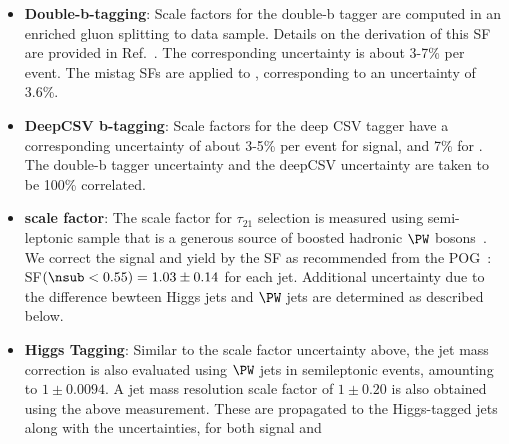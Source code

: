 \begin{itemize}
\item \textbf{Double-b-tagging}: Scale factors for the double-b tagger are computed in an enriched gluon splitting to \bbbar data sample. Details on the derivation of this SF are provided in Ref.~\cite{DoubleBSFTWiki}. The corresponding uncertainty is about 3-7\% per event. The mistag SFs are applied to \ttbar, corresponding to an uncertainty of 3.6\%.

\item \textbf{DeepCSV b-tagging}: Scale factors for the deep CSV tagger have a corresponding uncertainty of about 3-5\% per event for signal, and 7\% for \ttbar. The double-b tagger uncertainty and the deepCSV uncertainty are taken to be 100\% correlated.

\item \textbf{\nsub scale factor}: The scale factor for $\tau_{21}$ selection is measured using semi-leptonic \ttbar sample that is a generous source of boosted hadronic $\PW$ bosons~\cite{CMS-AN-17-051}. We correct the signal and \ttbar yield by the SF as recommended from the POG~\cite{Wtagging}: SF$(\nsub < 0.55) = 1.03 \pm 0.14$ for each jet. Additional uncertainty due to the difference bewteen Higgs jets and $\PW$ jets are determined as described below.
  
\item \textbf{Higgs Tagging}: Similar to the \nsub scale factor uncertainty above, the jet mass correction is also evaluated using $\PW$ jets in semileptonic \ttjets events, amounting to $1 \pm 0.0094$. A jet mass resolution scale factor of $1 \pm 0.20$ is also obtained using the above measurement. These are propagated to the Higgs-tagged jets along with the uncertainties, for both signal and \ttbar


\end{itemize}
